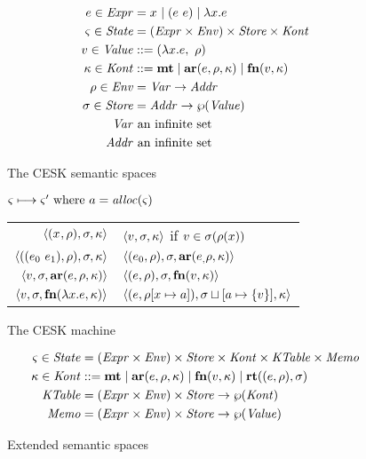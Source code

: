 \documentclass{llncs}
\begin{document}
\begin{figure}
  \begin{align*}
    e \in \mathit{Expr} &= x^{{}} \mid (e\ e){} \mid \lambda{} x. e \\
    \varsigma \in \mathit{State} &= (\mathit{Expr} \times \mathit{Env}) \times \mathit{Store} \times \mathit{Kont} \\
    v \in \mathit{Value} &::= (\lambda{} x. e,\ \rho) \\
    \kappa \in \mathit{Kont} &::= \mathbf{mt} \mid \mathbf{ar}{}(e,\rho,\kappa) \mid \mathbf{fn}{}(v,\kappa) \\
    \rho \in \mathit{Env} &= \mathit{Var} \to \mathit{Addr} \\
    \sigma \in \mathit{Store} &= \mathit{Addr} \to \wp(\mathit{Value}) \\
    \mathit{Var} &\text{ an infinite set} \\
    \mathit{Addr} &\text{ an infinite set}
  \end{align*}
  \caption{The CESK semantic spaces}
\label{fig:cesk-spaces}
\end{figure}

\begin{figure}
  \centering
  $\varsigma \longmapsto \varsigma' \text{ where } a = \mathit{alloc}(\varsigma)$ \\
  \begin{tabular}{r|l}
    \hline
    $\langle (x^{{}}, \rho), \sigma, \kappa \rangle$
    &
    $\langle v,\sigma,\kappa \rangle$ if $v \in \sigma(\rho(x))$
    \\
    $\langle ((e_{0}\ e_{1}){}, \rho), \sigma, \kappa \rangle$
    &
    $\langle (e_{0}, \rho), \sigma, \mathbf{ar}{}(e_{,}\rho,\kappa) \rangle$
    \\
    $\langle v, \sigma, \mathbf{ar}{}(e,\rho,\kappa) \rangle$
    &
    $\langle (e, \rho), \sigma, \mathbf{fn}{}(v, \kappa) \rangle$
    \\
    $\langle v,\sigma,\mathbf{fn}{}(\lambda{} x. e, \kappa) \rangle$
    &
    $\langle (e, \rho[x \mapsto a]), \sigma\sqcup[a \mapsto \{ v \}], \kappa \rangle$
  \end{tabular}
  \caption{The CESK machine}
  \label{fig:base-semantics}
\end{figure}

\begin{figure}
  \begin{align*}
    \varsigma \in \mathit{State} &= (\mathit{Expr} \times \mathit{Env}) \times \mathit{Store} \times \mathit{Kont} \times \mathit{KTable} \times \mathit{Memo} \\
    \kappa \in \mathit{Kont} &::= \mathbf{mt} \mid \mathbf{ar}{}(e,\rho,\kappa) \mid \mathbf{fn}{}(v,\kappa) \mid \mathbf{rt}((e,\rho),\sigma)\\
    \mathit{KTable} &= (\mathit{Expr} \times \mathit{Env})\times \mathit{Store} \to \wp(\mathit{Kont}) \\
    \mathit{Memo} &= (\mathit{Expr} \times \mathit{Env})\times \mathit{Store} \to \wp(\mathit{Value})
  \end{align*}
  \caption{Extended semantic spaces}
\label{fig:cesk-ext-spaces}
\end{figure}
\end{document}
